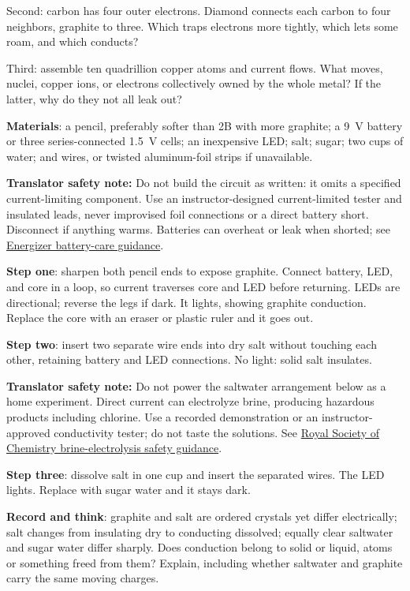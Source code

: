 Second: carbon has four outer electrons. Diamond connects each carbon to four neighbors, graphite to three. Which traps electrons more tightly, which lets some roam, and which conducts?

Third: assemble ten quadrillion copper atoms and current flows. What moves, nuclei, copper ions, or electrons collectively owned by the whole metal? If the latter, why do they not all leak out?


\begin{experiment}
\textbf{Materials}: a pencil, preferably softer than 2B with more graphite; a 9~V battery or three series-connected 1.5~V cells; an inexpensive LED; salt; sugar; two cups of water; and wires, or twisted aluminum-foil strips if unavailable.

\textbf{Translator safety note:} Do not build the circuit as written: it omits a specified current-limiting component. Use an instructor-designed current-limited tester and insulated leads, never improvised foil connections or a direct battery short. Disconnect if anything warms. Batteries can overheat or leak when shorted; see \href{https://oem.energizer.com/english/dos-donts/}{Energizer battery-care guidance}.

\textbf{Step one}: sharpen both pencil ends to expose graphite. Connect battery, LED, and core in a loop, so current traverses core and LED before returning. LEDs are directional; reverse the legs if dark. It lights, showing graphite conduction. Replace the core with an eraser or plastic ruler and it goes out.

\textbf{Step two}: insert two separate wire ends into dry salt without touching each other, retaining battery and LED connections. No light: solid salt insulates.

\textbf{Translator safety note:} Do not power the saltwater arrangement below as a home experiment. Direct current can electrolyze brine, producing hazardous products including chlorine. Use a recorded demonstration or an instructor-approved conductivity tester; do not taste the solutions. See \href{https://edu.rsc.org/experiments/electrolysis-of-brine/735.article}{Royal Society of Chemistry brine-electrolysis safety guidance}.

\textbf{Step three}: dissolve salt in one cup and insert the separated wires. The LED lights. Replace with sugar water and it stays dark.

\textbf{Record and think}: graphite and salt are ordered crystals yet differ electrically; salt changes from insulating dry to conducting dissolved; equally clear saltwater and sugar water differ sharply. Does conduction belong to solid or liquid, atoms or something freed from them? Explain, including whether saltwater and graphite carry the same moving charges.
\end{experiment}

